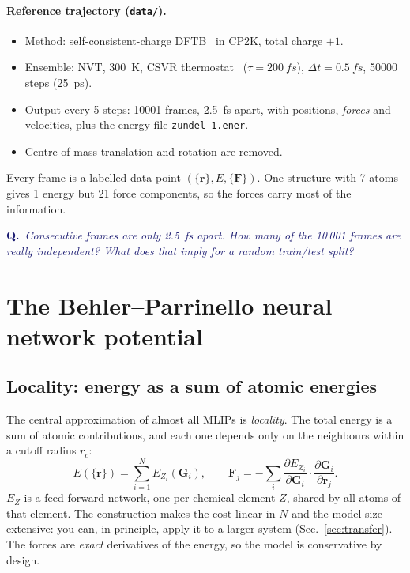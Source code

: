 \documentclass[11pt,a4paper]{article}
\newcommand{\question}[1]{\par\smallskip\noindent\textcolor{MidnightBlue}{\textbf{Q.}~\emph{#1}}\par\smallskip}
\begin{document}
\paragraph{Reference trajectory (\texttt{data/}).}
\begin{itemize}[nosep]
  \item Method: self-consistent-charge DFTB~\cite{Elstner1998} in CP2K, total charge $+1$.
  \item Ensemble: NVT, \SI{300}{K}, CSVR thermostat~\cite{Bussi2007} ($\tau=\SI{200}{fs}$), $\Delta t = \SI{0.5}{fs}$, \num{50000} steps (\SI{25}{ps}).
  \item Output every 5 steps: \num{10001} frames, \SI{2.5}{fs} apart, with positions, \emph{forces} and velocities, plus the energy file \texttt{zundel-1.ener}.
  \item Centre-of-mass translation and rotation are removed.
\end{itemize}
Every frame is a labelled data point $(\{\mathbf r\}, E, \{\mathbf F\})$.
One structure with 7 atoms gives 1 energy but 21 force components, so the
forces carry most of the information.

\question{Consecutive frames are only \SI{2.5}{fs} apart. How many of the
10\,001 frames are really \emph{independent}? What does that imply for a
random train/test split?}

\section{The Behler--Parrinello neural network potential}

\subsection{Locality: energy as a sum of atomic energies}
The central approximation of almost all MLIPs is \emph{locality}. The total
energy is a sum of atomic contributions, and each one depends only on the
neighbours within a cutoff radius $r_c$:
\begin{equation}
  E(\{\mathbf r\}) = \sum_{i=1}^{N} E_{Z_i}\!\left(\mathbf G_i\right),
  \qquad
  \mathbf F_j = -\sum_i \frac{\partial E_{Z_i}}{\partial \mathbf G_i}\cdot
                 \frac{\partial \mathbf G_i}{\partial \mathbf r_j}.
  \label{eq:hdnnp}
\end{equation}
$E_{Z}$ is a feed-forward network, one per chemical element $Z$, shared by all
atoms of that element. The construction makes the cost linear in $N$ and the
model size-extensive: you can, in principle, apply it to a larger system
(Sec.~\ref{sec:transfer}). The forces are \emph{exact} derivatives of the
energy, so the model is conservative by design.
\end{document}
